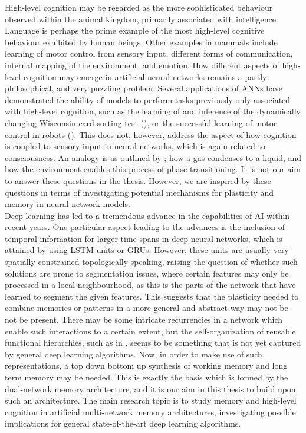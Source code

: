 High-level cognition may be regarded as the more sophisticated behaviour observed within the animal kingdom, primarily associated with intelligence. Language is perhaps the prime example of the most high-level cognitive behaviour exhibited by human beings. Other examples in mammals include learning of motor control from sensory input, different forms of communication, internal mapping of the environment, and emotion.
How different aspects of high-level cognition may emerge in artificial neural networks remains a partly philosophical, and very puzzling problem. Several applications of ANNs have demonstrated the ability of models to perform tasks previously only associated with high-level cognition, such as the learning of and inference of the dynamically changing Wisconsin card sorting test (\cite{Maniadakis2012}), or the successful learning of motor control in robots (\cite{Sugita2005, Yamashita2008, Tani2014}). 
This does not, however, address the aspect of how cognition is coupled to sensory input in neural networks, which is again related to consciousness. An analogy is as outlined by \cite{Freeman2003}; how a gas condenses to a liquid, and how the environment enables this process of phase transitioning.
It is not our aim to answer these questions in the thesis. However, we are inspired by these questions in terms of investigating potential mechanisms for plasticity and memory in neural network models.
\\

Deep learning has led to a tremendous advance in the capabilities of AI within recent years. One particular aspect leading to the advances is the inclusion of temporal information for larger time spans in deep neural networks, which is attained by using LSTM units or GRUs. However, these units are usually very spatially constrained topologically speaking, raising the question of whether such solutions are prone to segmentation issues, where certain features may only be processed in a local neighbourhood, as this is the parts of the network that have learned to segment the given features. This suggests that the plasticity needed to combine memories or patterns in a more general and abstract way may not be not be present. There may be some intricate recurrencies in a network which enable such interactions to a certain extent, but the self-organization of reusable functional hierarchies, such as in \cite{Tani2014}, seems to be something that is not yet captured by general deep learning algorithms. Now, in order to make use of such representations, a top down bottom up synthesis of working memory and long term memory may be needed. This is exactly the basis which is formed by the dual-network memory architecture, and it is our aim in this thesis to build upon such an architecture. 
The main research topic is to study memory and high-level cognition in artificial multi-network memory architectures, investigating possible implications for general state-of-the-art deep learning algorithms.

